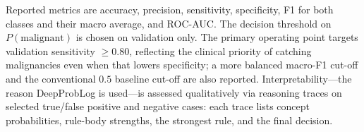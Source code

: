 Reported metrics are accuracy, precision, sensitivity, specificity, F1 for both classes and their macro average, and ROC-AUC. The decision threshold on $P(\mathrm{malignant})$ is chosen on validation only. The primary operating point targets validation sensitivity $\geq 0.80$, reflecting the clinical priority of catching malignancies even when that lowers specificity; a more balanced macro-F1 cut-off and the conventional $0.5$ baseline cut-off are also reported. Interpretability---the reason DeepProbLog is used---is assessed qualitatively via reasoning traces on selected true/false positive and negative cases: each trace lists concept probabilities, rule-body strengths, the strongest rule, and the final decision.
